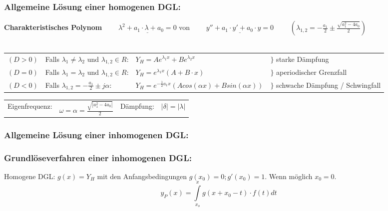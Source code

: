 \subsubsection{Allgemeine Lösung einer homogenen DGL:\quad{}}
\textbf{Charakteristisches Polynom}
$\qquad\underline{\lambda^2+a_1\cdot\lambda+a_0=0}$ \hspace{1cm}von
$\qquad\underline{y''+a_1\cdot y'+a_0\cdot y=0}$ 
$\qquad(\lambda_{1,2} = -\frac{a_1}{2} \pm \frac{\sqrt{a_1^2 - 4a_0}}{2})$\\ \\

\begin{tabular}{p{2cm}p{5cm}p{6cm}p{4cm}}
$(D > 0)$ &
Falls $\lambda_1\neq \lambda_2$ und $\lambda_{1,2} \in R$: &
$Y_H=Ae^{\lambda_1x}+Be^{\lambda_2x}$ & 
$\rbrace$ starke Dämpfung\\

$(D = 0)$ &
Falls $\lambda_1=\lambda_2$ und $\lambda_{1,2} \in R$: &
$Y_H=e^{\lambda_1x}(A+B\cdot x)$ & 
$\rbrace$ aperiodischer Grenzfall\\

$(D < 0)$ &
Falls $\lambda_{1,2}=-\frac{a_1}{2}\pm j\alpha$: &
$Y_H=e^{-\frac{1}{2}a_1x}(Acos(\alpha x) +Bsin(\alpha x))$ &
$\rbrace$ schwache Dämpfung / Schwingfall \\
\end{tabular}

\begin{tabular}{p{2cm}p{5cm}p{2cm}p{4cm}}
	Eigenfrequenz: & $\omega = \alpha = \frac{\sqrt{|a_1^2 - 4a_0|}}{2}$ &
	Dämpfung: &  $|\delta| = |\lambda|$\\
\end{tabular}

\subsubsection{Allgemeine Lösung einer inhomogenen DGL:\quad{}}

\subsubsection{Grundlöseverfahren einer inhomogenen DGL:\quad{}}
Homogene DGL: $g(x) = Y_H$ mit den Anfangsbedingungen $g(x_0) = 0; g'(x_0) = 1$. Wenn möglich $x_0 = 0$.\\
$$y_P(x)=\int\limits_{x_o}^{x} g(x+x_0-t)\cdot f(t)dt$$	

